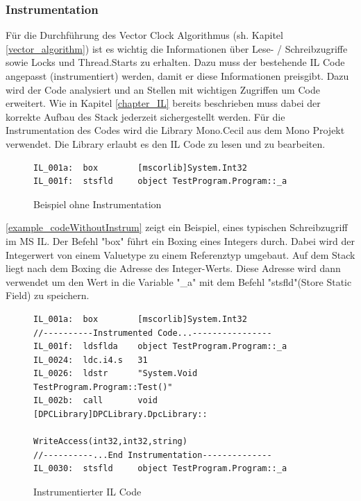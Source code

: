 \documentclass[10pt,a4paper]{article}
\begin{document}
\subsubsection{Instrumentation}
\begin{flushleft}
Für die Durchführung des Vector Clock Algorithmus (sh. Kapitel \ref{vector_algorithm}) ist es wichtig die Informationen über Lese- / Schreibzugriffe sowie Locks und Thread.Starts zu erhalten. Dazu muss der bestehende IL Code angepasst (instrumentiert) werden, damit er diese Informationen preisgibt. Dazu wird der Code analysiert und an Stellen mit wichtigen Zugriffen um Code erweitert. Wie in Kapitel \ref{chapter_IL} bereits beschrieben muss dabei der korrekte Aufbau des Stack jederzeit sichergestellt werden. Für die Instrumentation des Codes wird die Library Mono.Cecil aus dem Mono Projekt verwendet. Die Library erlaubt es den IL Code zu lesen und zu bearbeiten. 
\begin{figure}[H]
\centering
\begin{lstlisting}[language=CIL,backgroundcolor=\color{backcolor}]
IL_001a:  box        [mscorlib]System.Int32
IL_001f:  stsfld     object TestProgram.Program::_a
\end{lstlisting}
\caption{Beispiel ohne Instrumentation}\label{example_codeWithoutInstrum}
\end{figure}
\autoref{example_codeWithoutInstrum} zeigt ein Beispiel, eines typischen Schreibzugriff im MS IL. Der Befehl "box" führt ein Boxing eines Integers durch. Dabei wird der Integerwert von einem Valuetype zu einem Referenztyp umgebaut. Auf dem Stack liegt nach dem Boxing die Adresse des Integer-Werts. Diese Adresse wird dann verwendet um den Wert in die Variable "\_a" mit dem Befehl "stsfld"(Store Static Field) zu speichern.\\
\begin{figure}[H]
\centering
\begin{lstlisting}[language=CIL,backgroundcolor=\color{backcolor}]
IL_001a:  box        [mscorlib]System.Int32
//----------Instrumented Code...----------------
IL_001f:  ldsflda    object TestProgram.Program::_a
IL_0024:  ldc.i4.s   31
IL_0026:  ldstr      "System.Void TestProgram.Program::Test()"
IL_002b:  call       void [DPCLibrary]DPCLibrary.DpcLibrary::
                                 WriteAccess(int32,int32,string)
//----------...End Instrumentation--------------
IL_0030:  stsfld     object TestProgram.Program::_a
\end{lstlisting}
\caption{Instrumentierter IL Code}\label{example_instrumentedCode}

\end{figure}
\end{flushleft}
\end{document}
